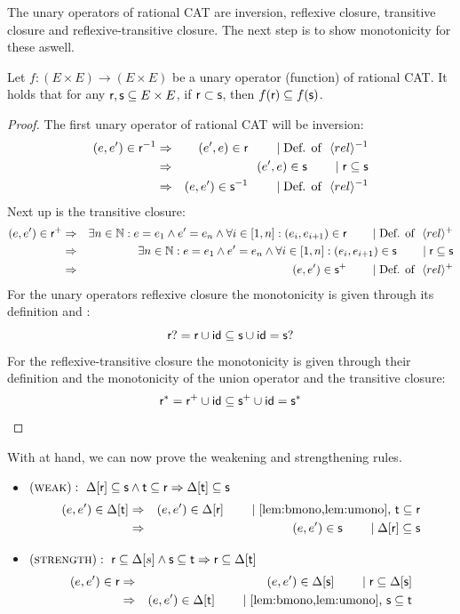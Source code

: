 \documentclass[a4paper,twoside,12pt, english]{article}
\begin{document}
\noindent The unary operators of rational CAT are inversion, reflexive closure, transitive closure and reflexive-transitive closure. The next step is to show monotonicity for these aswell.

\pagebreak
\begin{lemma}\label{lem:umono} Let $f:(E\times E) \rightarrow (E \times E)$ be a unary operator (function) of rational CAT. It holds that for any $\textsf{\upshape r},\textsf{\upshape s} \subseteq E \times E$, if $\sf r \subset s$, then $f(\textsf{\upshape r}) \subseteq f(\textsf{\upshape s})$.
\end{lemma}
\begin{proof}
The first unary operator of rational CAT will be inversion:
\begin{eqnarray*}
(e,e') \in \textsf{\upshape r}^{-1} &\Rightarrow & (e',e) \in \textsf{\upshape r} \qquad \mid \text{Def. of }~ \langle rel \rangle^{-1}\\
&\Rightarrow & (e',e) \in \sf s \qquad \mid \sf r \subseteq s \\
&\Rightarrow & (e,e') \in \textsf{\upshape s}^{-1} \qquad \mid \text{Def. of }~ \langle rel \rangle^{-1}
\end{eqnarray*}
Next up is the transitive closure:
\begin{eqnarray*}
(e,e') \in \textsf{\upshape r}^+ &\Rightarrow & \exists n \in \mathbb{N}: e=e_1 \land e' = e_n \land \forall i \in [1,n]: (e_i,e_{i+1}) \in \textsf{\upshape r} \qquad \mid \text{Def. of }~ \langle rel \rangle^+ \\
&\Rightarrow & \exists n \in \mathbb{N}: e=e_1 \land e' = e_n \land \forall i \in [1,n]: (e_i,e_{i+1}) \in \textsf{\upshape s} \qquad \mid \sf r \subseteq s \\
&\Rightarrow & (e,e') \in \textsf{\upshape s}^+ \qquad \mid \text{Def. of }~ \langle rel \rangle^+
\end{eqnarray*}
For the unary operators reflexive closure the monotonicity is given through its definition and :
\[\textsf{\upshape r}? = \textsf{\upshape r} \cup \textsf{\upshape id} \subseteq \textsf{\upshape s} \cup \textsf{\upshape id} = \textsf{\upshape s}?\]
For the reflexive-transitive closure the monotonicity is given through their definition and the monotonicity of the union operator and the transitive closure:
\[\textsf{\upshape r}^* = \textsf{\upshape r}^+ \cup \textsf{\upshape id} \subseteq \textsf{\upshape s}^+ \cup \textsf{\upshape id} = \textsf{\upshape s}^*\]
\end{proof}

\noindent With  at hand, we can now prove the weakening and strengthening rules.
\begin{itemize}
\item $(\textsc{weak}):~ \Delta[\textsf{\upshape r}] \subseteq \textsf{\upshape s} \land {\sf t \subseteq r} \Rightarrow \Delta[\textsf{\upshape t}] \subseteq \textsf{\upshape s}$
\begin{eqnarray*}
(e,e') \in \Delta[\relt] &\impl & (e,e') \in \Delta[\relr] \reason{\text{\Cref{lem:bmono,lem:umono}, } \sf t \subseteq r} \\
& \impl & (e,e') \in \rels \reason{\Delta[\relr] \subseteq \rels}
\end{eqnarray*}
\item $(\textsc{strength}):~ \textsf{\upshape r} \subseteq \Delta[s] \land \textsf{\upshape s} \subseteq \textsf{\upshape t} \Rightarrow \textsf{\upshape r} \subseteq \Delta[\textsf{\upshape t}]$
\begin{eqnarray*}
\edgein \relr &\impl & \edgein \Delta[\rels] \reason{\relr \subseteq \Delta[\rels]} \\
&\impl & \edgein \Delta[\relt] \reason{\text{\Cref{lem:bmono,lem:umono}, } \rels \subseteq \relt}
\end{eqnarray*}
\end{itemize}
\end{document}
